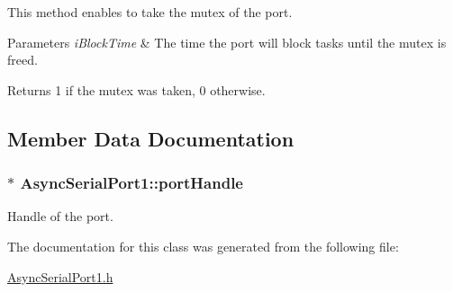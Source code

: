 \-This method enables to take the mutex of the port. 


\begin{DoxyParams}{\-Parameters}
{\em i\-Block\-Time} & \-The time the port will block tasks until the mutex is freed.\\
\hline
\end{DoxyParams}
\begin{DoxyReturn}{\-Returns}
1 if the mutex was taken, 0 otherwise. 
\end{DoxyReturn}


\subsection{\-Member \-Data \-Documentation}
\hypertarget{class_async_serial_port1_a9661343083970644038cc10ba8e3d0a5}{
\subsubsection[{port\-Handle}]{$\ast$ {\bf \-Async\-Serial\-Port1\-::port\-Handle}}}\label{class_async_serial_port1_a9661343083970644038cc10ba8e3d0a5}
\-Handle of the port. 

\-The documentation for this class was generated from the following file\-:\begin{DoxyCompactItemize}
\item 
\hyperlink{_async_serial_port1_8h}{\-Async\-Serial\-Port1.\-h}\end{DoxyCompactItemize}
